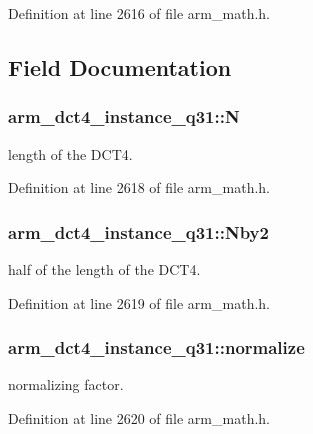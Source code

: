 Definition at line 2616 of file arm\-\_\-math.\-h.



\subsection{Field Documentation}
\hypertarget{structarm__dct4__instance__q31_a46a9f136457350676e2bfd3768ff9d6d}{
\subsubsection[{N}]{ arm\-\_\-dct4\-\_\-instance\-\_\-q31\-::\-N}}\label{structarm__dct4__instance__q31_a46a9f136457350676e2bfd3768ff9d6d}
length of the D\-C\-T4. 

Definition at line 2618 of file arm\-\_\-math.\-h.

\hypertarget{structarm__dct4__instance__q31_a32d3268ba4629908dba056599f0a904d}{
\subsubsection[{Nby2}]{ arm\-\_\-dct4\-\_\-instance\-\_\-q31\-::\-Nby2}}\label{structarm__dct4__instance__q31_a32d3268ba4629908dba056599f0a904d}
half of the length of the D\-C\-T4. 

Definition at line 2619 of file arm\-\_\-math.\-h.

\hypertarget{structarm__dct4__instance__q31_ac80ff7b28fca36aeef74dea12e8312dd}{
\subsubsection[{normalize}]{ arm\-\_\-dct4\-\_\-instance\-\_\-q31\-::normalize}}\label{structarm__dct4__instance__q31_ac80ff7b28fca36aeef74dea12e8312dd}
normalizing factor. 

Definition at line 2620 of file arm\-\_\-math.\-h.

